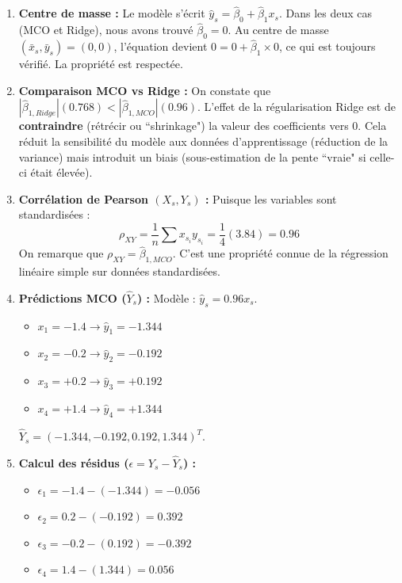 \documentclass[solutions]{../exercices}
\begin{document}
\begin{solution}
\begin{enumerate}
		\item \textbf{Centre de masse :}
		Le modèle s'écrit $\hat{y}_s = \hat{\beta}_0 + \hat{\beta}_1 x_s$.
		Dans les deux cas (MCO et Ridge), nous avons trouvé $\hat{\beta}_0 = 0$.
		Au centre de masse $(\bar{x}_s, \bar{y}_s) = (0, 0)$, l'équation devient $0 = 0 + \hat{\beta}_1 \times 0$, ce qui est toujours vérifié. La propriété est respectée.

		\item \textbf{Comparaison MCO vs Ridge :}
		On constate que $|\hat{\beta}_{1, Ridge}| (0.768) < |\hat{\beta}_{1, MCO}| (0.96)$.
		L'effet de la régularisation Ridge est de \textbf{contraindre} (rétrécir ou ``shrinkage") la valeur des coefficients vers 0. Cela réduit la sensibilité du modèle aux données d'apprentissage (réduction de la variance) mais introduit un biais (sous-estimation de la pente ``vraie" si celle-ci était élevée).

		\item \textbf{Corrélation de Pearson $(X_s, Y_s)$ :}
		Puisque les variables sont standardisées :
		\[ \rho_{XY} = \frac{1}{n} \sum x_{s_i} y_{s_i} = \frac{1}{4} (3.84) = 0.96 \]
		On remarque que $\rho_{XY} = \hat{\beta}_{1, MCO}$. C'est une propriété connue de la régression linéaire simple sur données standardisées.

		\item \textbf{Prédictions MCO ($\hat{Y}_s$) :}
		Modèle : $\hat{y}_s = 0.96 x_s$.
		\begin{itemize}
			\item $x_1 = -1.4 \to \hat{y}_1 = -1.344$
			\item $x_2 = -0.2 \to \hat{y}_2 = -0.192$
			\item $x_3 = +0.2 \to \hat{y}_3 = +0.192$
			\item $x_4 = +1.4 \to \hat{y}_4 = +1.344$
		\end{itemize}
		$\hat{Y}_s = (-1.344, -0.192, 0.192, 1.344)^T$.

		\item \textbf{Calcul des résidus ($\epsilon = Y_s - \hat{Y}_s$) :}
		\begin{itemize}
			\item $\epsilon_1 = -1.4 - (-1.344) = -0.056$
			\item $\epsilon_2 = 0.2 - (-0.192) = 0.392$
			\item $\epsilon_3 = -0.2 - (0.192) = -0.392$
			\item $\epsilon_4 = 1.4 - (1.344) = 0.056$
		\end{itemize}


\end{enumerate}
\end{solution}
\end{document}
